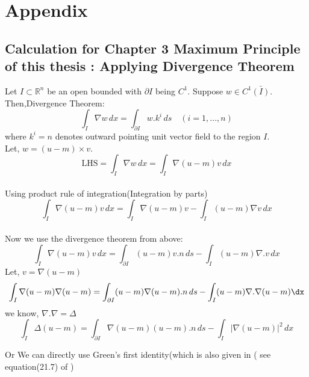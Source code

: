 \printbibliography %



















\section{Appendix}
\subsection{Calculation for Chapter 3 Maximum Principle of this thesis : Applying Divergence Theorem }

Let $I\subset \mathbb{R}^{n}$ be an open bounded with $\partial I $ being $C^{1}$. Suppose $w \in C^{1}\bar{(I)}$. Then,Divergence Theorem:\\
\begin{equation}
    \int_{I} \nabla w \,dx = \int_{\partial I} w. k^{i} \,ds \quad (i=1,...,n)
\end{equation}
where $k^{i}=n$ denotes outward pointing unit vector field to the region $I$.\\
Let, $w=(u-m) \times v$. \\
\[
\text{LHS}=
\int_{I} \nabla w \,dx  =   \int_{I} \nabla (u-m)v \,dx
\]\\
Using product rule of integration(Integration by parts)
\[
\int_{I}\nabla(u-m)v\,dx = \int_{I}\nabla{(u-m)v} - \int_{I}(u-m)\nabla v\,dx
\]\\
Now we use the divergence theorem from above:
\[
\int_{I}\nabla(u-m)v\,dx = \int_{\partial I}(u-m)v.n\,ds - \int_{I}(u-m)\nabla .v\,dx
\]
Let, $v=\nabla (u-m)$  
\[
\int_{I}\nabla(u-m) \nabla(u-m) = \int_{\partial I}(u-m) \nabla  (u-m).n \,ds-\int_{I}(u-m)\nabla .\nabla(u-m)\dx
\]
we know, $\nabla.\nabla=\Delta$
\begin{equation}
\int_{I}\Delta(u-m)=\int_{\partial I}\nabla(u-m)(u-m).n\,ds - \int_{I}|\nabla(u-m)|^{2}\,dx
\end{equation}

Or We can directly use Green's first identity(which is also given in ( see equation(21.7) of  \cite{green} )







